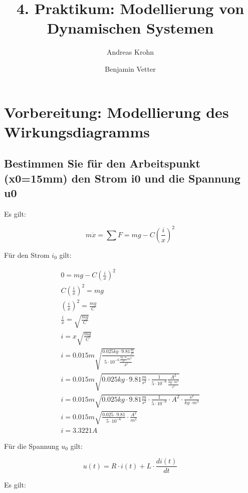 \documentclass[a4paper,10pt,left=1.5cm,right=1.5cm,top=1.5cm,bottom=1.5cm]{article}
\title{4. Praktikum: Modellierung von Dynamischen Systemen}
\author{Andreas Krohn \and Benjamin Vetter}
\begin{document}
\maketitle

\tableofcontents

\section{Vorbereitung: Modellierung des Wirkungsdiagramms}

\subsection{Bestimmen Sie für den Arbeitspunkt (x0=15mm) den Strom i0 und die Spannung u0}

Es gilt:

\begin{equation}
  m\ddot{x}=\sum F=mg-C(\frac{i}{x})^2
\end{equation}

Für den Strom $i_0$ gilt:

\begin{eqnarray*}
  0 = mg-C(\frac{i}{x})^2 \\
  C(\frac{i}{x})^2 = mg \\
  (\frac{i}{x})^2 = \frac{mg}{C} \\
  \frac{i}{x} = \sqrt{\frac{mg}{C}} \\
  i = x\sqrt{\frac{mg}{C}} \\
  i = 0.015m \sqrt{\frac{0.025kg \cdot 9.81 \frac{m}{s^2}}{5 \cdot 10^{-6} \frac{\frac{kg \cdot m}{s^2} m^2}{A^2}}} \\
  i = 0.015m \sqrt{0.025kg \cdot 9.81 \frac{m}{s^2} \cdot \frac{1}{5 \cdot 10^{-6}} \frac{A^2}{\frac{kg \cdot m^3}{s^2}}} \\
  i = 0.015m \sqrt{0.025kg \cdot 9.81 \frac{m}{s^2} \cdot \frac{1}{5 \cdot 10^{-6}} \cdot A^2 \cdot \frac{s^2}{kg \cdot m^3}} \\
  i = 0.015m \sqrt{\frac{0.025 \cdot 9.81}{5 \cdot 10^{-6}} \cdot \frac{A^2}{m^2}} \\
  i = 3.3221 A
\end{eqnarray*}

Für die Spannung $u_0$ gilt:

\begin{equation}
  u(t) = R \cdot i(t) + L \cdot \frac{di(t)}{dt}
\end{equation}

Es gilt:
\end{document}

